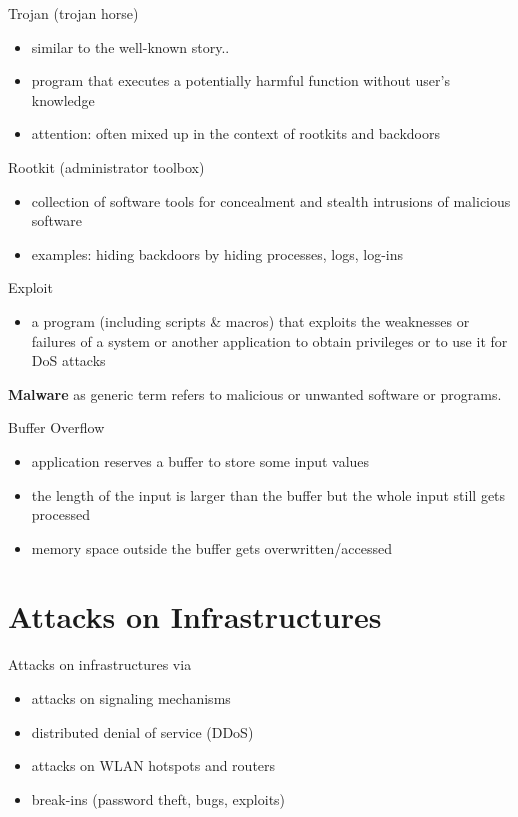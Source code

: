 \documentclass[11pt]{article}
\begin{document}
Trojan (trojan horse)
\begin{itemize}
\item similar to the well-known story..
\item program that executes a potentially harmful function without user's knowledge
\item attention: often mixed up in the context of rootkits and backdoors
\end{itemize}

Rootkit (administrator toolbox)
\begin{itemize}
\item collection of software tools for concealment and stealth intrusions of malicious software
\item examples: hiding backdoors by hiding processes, logs, log-ins
\end{itemize}

Exploit
\begin{itemize}
\item a program (including scripts \& macros) that exploits the weaknesses or failures of a system or another application to obtain privileges or to use it for DoS attacks
\end{itemize}

\textbf{Malware} as generic term refers to malicious or unwanted software or programs.

Buffer Overflow
\begin{itemize}
\item application reserves a buffer to store some input values
\item the length of the input is larger than the buffer but the whole input still gets processed
\item memory space outside the buffer gets overwritten/accessed
\end{itemize}

\section{Attacks on Infrastructures}
\label{sec:orgbcdbff9}
Attacks on infrastructures via
\begin{itemize}
\item attacks on signaling mechanisms
\item distributed denial of service (DDoS)
\item attacks on WLAN hotspots and routers
\item break-ins (password theft, bugs, exploits)
\end{itemize}
\end{document}
